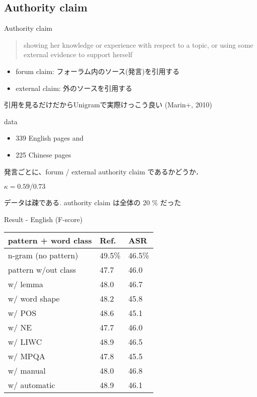 \documentclass[12pt, dvipdfmx, default, cjk]{beamer}
\begin{document}
\subsection{Authority claim}
\begin{frame}{Authority claim}
  \begin{quote}
    showing her knowledge or experience with respect to a topic, or using
    some external evidence to support herself
  \end{quote}

  \begin{itemize}
    \item \alert{forum} claim: フォーラム内のソース(発言)を引用する
    \item \alert{external} claim: 外のソースを引用する
  \end{itemize}

  引用を見るだけだからUnigramで実際けっこう良い (Marin+, 2010)
\end{frame}

\begin{frame}{data}
  \begin{itemize}
    \item 339 English pages and
    \item 225 Chinese pages
  \end{itemize}

  発言ごとに、\alert{forum} / \alert{external} authority claim であるかどうか．

  $\kappa = 0.59 / 0.73$

  データは疎である.
  authority claim は全体の 20 \% だった
\end{frame}

\begin{frame}{Result - English (F-score)}
  \begin{table}[h]
    \begin{tabular}{l|l|l} \hline
       pattern + word class & Ref.   & ASR \\ \hline
       n-gram (no pattern)  & \alert{49.5}\% & 46.5\% \\
       pattern w/out class  & 47.7   & 46.0 \\
       w/ lemma      & 48.0 & 46.7 \\
       w/ word shape & 48.2 & 45.8 \\
       w/ POS        & 48.6 & 45.1 \\
       w/ NE         & 47.7 & 46.0 \\
       w/ LIWC       & 48.9 & 46.5 \\
       w/ MPQA       & 47.8 & 45.5 \\
       w/ manual     & 48.0 & \alert{46.8} \\
       w/ automatic  & 48.9 & 46.1 \\ \hline
     \end{tabular}
   \end{table}
 \end{frame}
\end{document}
